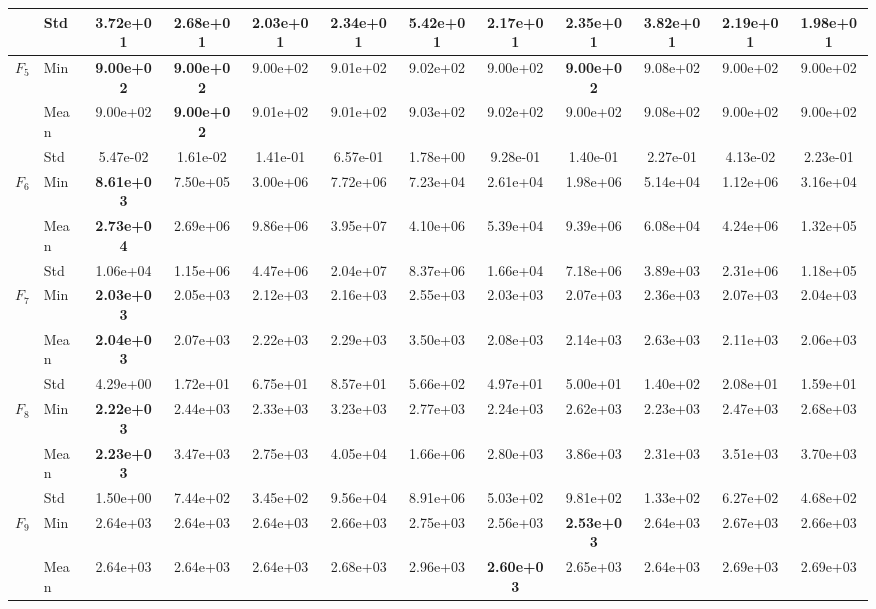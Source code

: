 \begin{center}
\begin{longtable}{clcccccccccc}
 & Std & 3.72e+01 & 2.68e+01 & 2.03e+01 & 2.34e+01 & 5.42e+01 & 2.17e+01 & 2.35e+01 & 3.82e+01 & 2.19e+01 & 1.98e+01 \\
\midrule
\multirow{3}{*}{$F_{5}$} & Min & \textbf{9.00e+02} & \textbf{9.00e+02} & 9.00e+02 & 9.01e+02 & 9.02e+02 & 9.00e+02 & \textbf{9.00e+02} & 9.08e+02 & 9.00e+02 & 9.00e+02 \\
 & Mean & 9.00e+02 & \textbf{9.00e+02} & 9.01e+02 & 9.01e+02 & 9.03e+02 & 9.02e+02 & 9.00e+02 & 9.08e+02 & 9.00e+02 & 9.00e+02 \\
 & Std & 5.47e-02 & 1.61e-02 & 1.41e-01 & 6.57e-01 & 1.78e+00 & 9.28e-01 & 1.40e-01 & 2.27e-01 & 4.13e-02 & 2.23e-01 \\
\midrule
\multirow{3}{*}{$F_{6}$} & Min & \textbf{8.61e+03} & 7.50e+05 & 3.00e+06 & 7.72e+06 & 7.23e+04 & 2.61e+04 & 1.98e+06 & 5.14e+04 & 1.12e+06 & 3.16e+04 \\
 & Mean & \textbf{2.73e+04} & 2.69e+06 & 9.86e+06 & 3.95e+07 & 4.10e+06 & 5.39e+04 & 9.39e+06 & 6.08e+04 & 4.24e+06 & 1.32e+05 \\
 & Std & 1.06e+04 & 1.15e+06 & 4.47e+06 & 2.04e+07 & 8.37e+06 & 1.66e+04 & 7.18e+06 & 3.89e+03 & 2.31e+06 & 1.18e+05 \\
\midrule
\multirow{3}{*}{$F_{7}$} & Min & \textbf{2.03e+03} & 2.05e+03 & 2.12e+03 & 2.16e+03 & 2.55e+03 & 2.03e+03 & 2.07e+03 & 2.36e+03 & 2.07e+03 & 2.04e+03 \\
 & Mean & \textbf{2.04e+03} & 2.07e+03 & 2.22e+03 & 2.29e+03 & 3.50e+03 & 2.08e+03 & 2.14e+03 & 2.63e+03 & 2.11e+03 & 2.06e+03 \\
 & Std & 4.29e+00 & 1.72e+01 & 6.75e+01 & 8.57e+01 & 5.66e+02 & 4.97e+01 & 5.00e+01 & 1.40e+02 & 2.08e+01 & 1.59e+01 \\
\midrule
\multirow{3}{*}{$F_{8}$} & Min & \textbf{2.22e+03} & 2.44e+03 & 2.33e+03 & 3.23e+03 & 2.77e+03 & 2.24e+03 & 2.62e+03 & 2.23e+03 & 2.47e+03 & 2.68e+03 \\
 & Mean & \textbf{2.23e+03} & 3.47e+03 & 2.75e+03 & 4.05e+04 & 1.66e+06 & 2.80e+03 & 3.86e+03 & 2.31e+03 & 3.51e+03 & 3.70e+03 \\
 & Std & 1.50e+00 & 7.44e+02 & 3.45e+02 & 9.56e+04 & 8.91e+06 & 5.03e+02 & 9.81e+02 & 1.33e+02 & 6.27e+02 & 4.68e+02 \\
\midrule
\multirow{3}{*}{$F_{9}$} & Min & 2.64e+03 & 2.64e+03 & 2.64e+03 & 2.66e+03 & 2.75e+03 & 2.56e+03 & \textbf{2.53e+03} & 2.64e+03 & 2.67e+03 & 2.66e+03 \\
 & Mean & 2.64e+03 & 2.64e+03 & 2.64e+03 & 2.68e+03 & 2.96e+03 & \textbf{2.60e+03} & 2.65e+03 & 2.64e+03 & 2.69e+03 & 2.69e+03 \\

\end{longtable}
\end{center}
